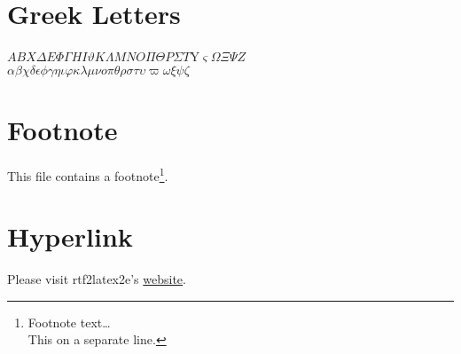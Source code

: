 \documentclass{article}
\begin{document}
\section*{Greek Letters}
\ensuremath{A}\ensuremath{B}\ensuremath{X}\ensuremath{\Delta}\ensuremath{E}\ensuremath{\Phi}\ensuremath{\Gamma}\ensuremath{H}\ensuremath{I}\ensuremath{\vartheta}\ensuremath{K}\ensuremath{\Lambda}\ensuremath{M}\ensuremath{N}\ensuremath{O}\ensuremath{\Pi}\ensuremath{\Theta}\ensuremath{P}\ensuremath{\Sigma}\ensuremath{T}Y\ensuremath{\varsigma}\ensuremath{\Omega}\ensuremath{\Xi}\ensuremath{\Psi}\ensuremath{Z}\\{}
\ensuremath{\alpha}\ensuremath{\beta}\ensuremath{\chi}\ensuremath{\delta}\ensuremath{\epsilon}\ensuremath{\phi}\ensuremath{\gamma}\ensuremath{\eta}\ensuremath{\iota}\ensuremath{\varphi}\ensuremath{\kappa}\ensuremath{\lambda}\ensuremath{\mu}\ensuremath{\nu}\ensuremath{o}\ensuremath{\pi}\ensuremath{\theta}\ensuremath{\rho}\ensuremath{\sigma}\ensuremath{\tau}\ensuremath{\upsilon}\ensuremath{\varpi}\ensuremath{\omega}\ensuremath{\xi}\ensuremath{\psi}\ensuremath{\zeta}



\section*{Footnote}
This file contains a footnote\footnote{Footnote text\dots  \\{}
This on a separate line.}.



\section*{Hyperlink}
Please visit rtf2latex2e's {\underline {website}}.
\end{document}
